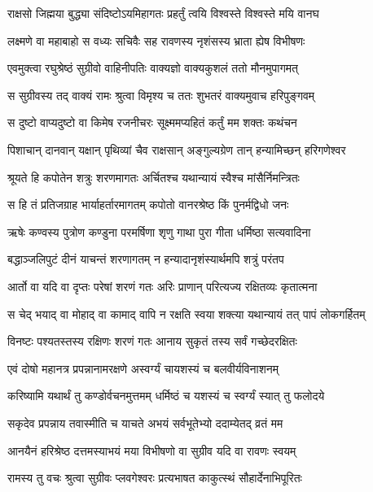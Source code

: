 \twolineshloka
{राक्षसो जिह्मया बुद्ध्या संदिष्टोऽयमिहागतः}
{प्रहर्तुं त्वयि विश्वस्ते विश्वस्ते मयि वानघ} %

\twolineshloka
{लक्ष्मणे वा महाबाहो स वध्यः सचिवैः सह}
{रावणस्य नृशंसस्य भ्राता ह्येष विभीषणः} %

\twolineshloka
{एवमुक्त्वा रघुश्रेष्ठं सुग्रीवो वाहिनीपतिः}
{वाक्यज्ञो वाक्यकुशलं ततो मौनमुपागमत्} %

\twolineshloka
{स सुग्रीवस्य तद् वाक्यं रामः श्रुत्वा विमृश्य च}
{ततः शुभतरं वाक्यमुवाच हरिपुङ्गवम्} %

\twolineshloka
{स दुष्टो वाप्यदुष्टो वा किमेष रजनीचरः}
{सूक्ष्ममप्यहितं कर्तुं मम शक्तः कथंचन} %

\twolineshloka
{पिशाचान् दानवान् यक्षान् पृथिव्यां चैव राक्षसान्}
{अङ्गुल्यग्रेण तान् हन्यामिच्छन् हरिगणेश्वर} %

\twolineshloka
{श्रूयते हि कपोतेन शत्रुः शरणमागतः}
{अर्चितश्च यथान्यायं स्वैश्च मांसैर्निमन्त्रितः} %

\twolineshloka
{स हि तं प्रतिजग्राह भार्याहर्तारमागतम्}
{कपोतो वानरश्रेष्ठ किं पुनर्मद्विधो जनः} %

\twolineshloka
{ऋषेः कण्वस्य पुत्रोण कण्डुना परमर्षिणा}
{शृणु गाथा पुरा गीता धर्मिष्ठा सत्यवादिना} %

\twolineshloka
{बद्धाञ्जलिपुटं दीनं याचन्तं शरणागतम्}
{न हन्यादानृशंस्यार्थमपि शत्रुं परंतप} %

\twolineshloka
{आर्तो वा यदि वा दृप्तः परेषां शरणं गतः}
{अरिः प्राणान् परित्यज्य रक्षितव्यः कृतात्मना} %

\twolineshloka
{स चेद् भयाद् वा मोहाद् वा कामाद् वापि न रक्षति}
{स्वया शक्त्या यथान्यायं तत् पापं लोकगर्हितम्} %

\twolineshloka
{विनष्टः पश्यतस्तस्य रक्षिणः शरणं गतः}
{आनाय सुकृतं तस्य सर्वं गच्छेदरक्षितः} %

\twolineshloka
{एवं दोषो महानत्र प्रपन्नानामरक्षणे}
{अस्वर्ग्यं चायशस्यं च बलवीर्यविनाशनम्} %

\twolineshloka
{करिष्यामि यथार्थं तु कण्डोर्वचनमुत्तमम्}
{धर्मिष्ठं च यशस्यं च स्वर्ग्यं स्यात् तु फलोदये} %

\twolineshloka
{सकृदेव प्रपन्नाय तवास्मीति च याचते}
{अभयं सर्वभूतेभ्यो ददाम्येतद् व्रतं मम} %

\twolineshloka
{आनयैनं हरिश्रेष्ठ दत्तमस्याभयं मया}
{विभीषणो वा सुग्रीव यदि वा रावणः स्वयम्} %

\twolineshloka
{रामस्य तु वचः श्रुत्वा सुग्रीवः प्लवगेश्वरः}
{प्रत्यभाषत काकुत्स्थं सौहार्देनाभिपूरितः} %

